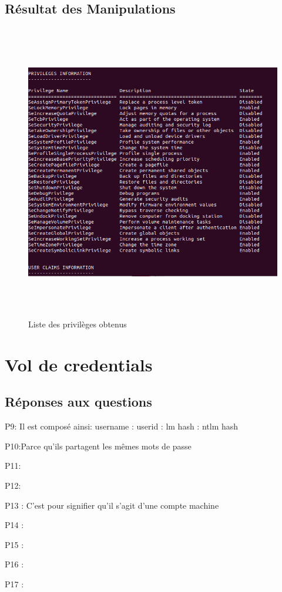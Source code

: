 \documentclass[12pt]{report} %
\begin{document}
\newpage
\subsection*{Résultat des Manipulations}
\begin{figure}[!h]
	\includegraphics[width=17cm, height=13cm]{Privileges_3_2.PNG}
	\caption*{Liste des privilèges obtenus}
\end{figure}



\newpage

\section*{Vol de credentials}

\subsection*{Réponses aux questions}

\par P9:	Il est composé ainsi: username : userid : lm hash : ntlm hash
\par P10:Parce qu'ils partagent les mêmes mots de passe
\par P11:
\par P12:
\par P13	: C'est pour signifier qu'il s'agit d'une compte machine
\par P14	: 
\par P15	: 
\par P16 : 
\par P17 :
\end{document}
